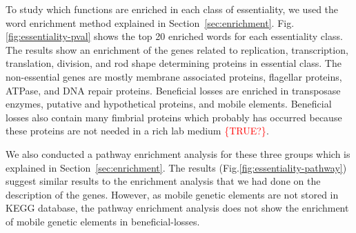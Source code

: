 \documentclass[12pt,letterpaper]{article}
\begin{document}
To study which functions are enriched in each class of essentiality, we used the word enrichment method explained in Section~\ref{sec:enrichment}. Fig.\@ \ref{fig:essentiality-pval} shows the top 20 enriched words for each essentiality class. The results show an enrichment of the genes related to replication, transcription, translation, division, and rod shape determining proteins in essential class. The non-essential genes are mostly membrane associated proteins, flagellar proteins, ATPase, and DNA repair proteins. Beneficial losses are enriched in transposase enzymes, putative and hypothetical proteins, and mobile elements. Beneficial losses also contain many fimbrial proteins which probably has occurred because these proteins are not needed in a rich lab medium \textcolor{red}{\{TRUE?\}}.

We also conducted a pathway enrichment analysis for these three groups which is explained in Section~\ref{sec:enrichment}. The results (Fig.\@ \ref{fig:essentiality-pathway}) suggest similar results to the enrichment analysis that we had done on the description of the genes. However, as mobile genetic elements are not stored in KEGG database, the pathway enrichment analysis does not show the enrichment of mobile genetic elements in beneficial-losses.
\end{document}
